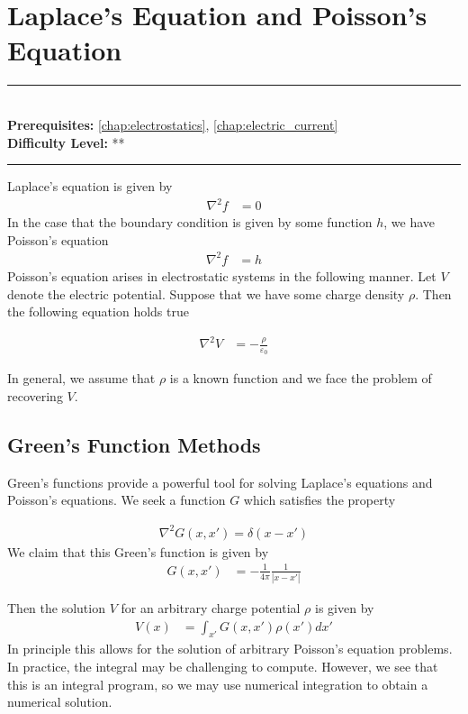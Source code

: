 \documentclass[book.tex]{subfiles}
\begin{document}
\chapter{Laplace's Equation and Poisson's Equation}

\label{chap:greens_laplace}
\noindent\rule{11cm}{0.4pt} \\
\textbf{Prerequisites:} \autoref{chap:electrostatics}, \autoref{chap:electric_current}  \\
\textbf{Difficulty Level:} ** \\
\noindent\rule{11cm}{0.4pt}
\vspace{5mm}

Laplace's equation is given by
\begin{align}
\nabla^2 f &= 0
\end{align}
In the case that the boundary condition is given by some function $h$, we have Poisson's equation
\begin{align}
\nabla^2 f &= h
\end{align}
Poisson's equation arises in electrostatic systems in the following manner. Let $V$ denote the electric potential. Suppose that we have some charge density $\rho$. Then the following equation holds true

\begin{align}
\nabla^2 V &= -\frac{\rho}{\varepsilon_0}
\end{align}

In general, we assume that $\rho$ is a known function and we face the problem of recovering $V$.

\section{Green's Function Methods}

Green's functions provide a powerful tool for solving Laplace's equations and Poisson's equations. We seek a function $G$ which satisfies the property

\begin{align}
\nabla^2 G(x, x') =  \delta(x-x') 
\end{align}
We claim that this Green's function is given by
\begin{align}
G(x, x') &= -\frac{1}{4\pi} \frac{1}{|x - x'|}
\end{align}

Then the solution $V$ for an arbitrary charge potential $\rho$ is given by
\begin{align}
V(x) &= \int_{x'} G(x, x') \rho(x') dx'
\end{align}
In principle this allows for the solution of arbitrary Poisson's equation problems. In practice, the integral may be challenging to compute. However, we see that this is an integral program, so we may use numerical integration to obtain a numerical solution.
\end{document}

